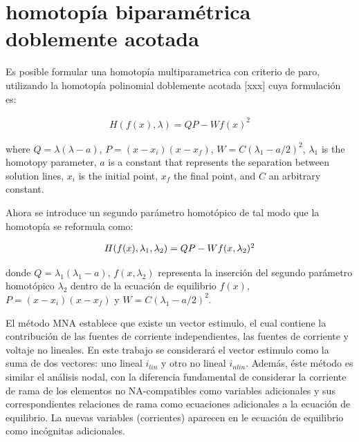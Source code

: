 \documentclass[conference,letterpaper,twocolumn]{IEEEtran}
\begin{document}
\section{homotopía biparamétrica doblemente acotada}

Es posible formular una homotopía multiparametrica con criterio de paro, utilizando
la homotopía polinomial doblemente acotada [xxx] cuya formulación es:

\begin{equation}
{
\begin{array}{l}
{H}({f}({x}),\lambda )=QP - W {f}({x})^2
\end{array}}
\label{homotopiaP}
\end{equation}

where $Q=\lambda(\lambda-a)$,  $P=(x-x_i)(x-x_f)$, $W=C(\lambda_1-a/2)^2$, $\lambda_1$ is the homotopy parameter, $a$ is a constant that represents the separation between solution lines, $x_i$ is the initial point, $x_f$ the final point, and $C$ an arbitrary constant.


Ahora se introduce un segundo parámetro homotópico de tal modo que la homotopía se reformula como:

\begin{equation}
{\small
\begin{array}{l}
{H}({f}({x}),\lambda_1, \lambda_2 )=QP - W {f}({x},\lambda_2)^2
\end{array}}
\label{homotopiaPx1}
\end{equation}

donde $Q=\lambda_1(\lambda_1-a)$, ${f}({x},\lambda_2)$ representa la inserción del segundo parámetro homotópico $\lambda_2$ dentro de la ecuación de equilibrio ${f}({x})$, $P=(x-x_i)(x-x_f)$ y $W=C(\lambda_1-a/2)^2$.

El método MNA establece que existe un vector estimulo, el cual contiene la contribución
de  las fuentes de corriente independientes, las fuentes de corriente y voltaje no lineales. 
En este trabajo se considerará el vector estimulo como la suma de dos vectores: uno lineal $i_{lin}$ y otro no lineal $i_{nlin}$.
Además, éste método es similar el análisis nodal, con la diferencia fundamental de
considerar la corriente de rama de los
elementos no NA-compatibles como variables adicionales y sus correspondientes
relaciones de rama como ecuaciones adicionales a la ecuación de equilibrio. La nuevas
variables (corrientes) aparecen en le ecuación de equilibrio como incógnitas adicionales.
\end{document}
